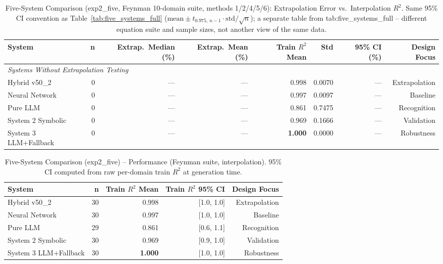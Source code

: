 \documentclass[twoside,11pt]{article}
\begin{document}
\begin{table}[t]
\centering
\caption{Five-System Comparison (exp2\_five, Feynman 10-domain suite,
  methods 1/2/4/5/6): Extrapolation Error vs.\ Interpolation $R^2$.
  Same 95\% CI convention as Table~\ref{tab:five_systems_full}
  ($\mathrm{mean} \pm t_{0.975,\,n-1} \cdot \mathrm{std}/\sqrt{n}$); a
  separate table from tab:five\_systems\_full -- different equation suite
  and sample sizes, not another view of the same data.}
\label{tab:five_systems_full_exp2five}
\begin{tabular}{lrrrrrrr}
\toprule
\textbf{System} & \textbf{n}
  & \textbf{Extrap.\ Median (\%)} & \textbf{Extrap.\ Mean (\%)}
  & \textbf{Train $R^2$ Mean} & \textbf{Std} & \textbf{95\% CI (\%)}
  & \textbf{Design Focus} \\
\midrule
\midrule
\multicolumn{8}{l}{\textit{Systems Without Extrapolation Testing}} \\
Hybrid v50\_2 & 0 & --- & --- & 0.998 & 0.0070 & --- & Extrapolation \\
Neural Network & 0 & --- & --- & 0.997 & 0.0097 & --- & Baseline \\
Pure LLM & 0 & --- & --- & 0.861 & 0.7475 & --- & Recognition \\
System 2 Symbolic & 0 & --- & --- & 0.969 & 0.1666 & --- & Validation \\
System 3 LLM+Fallback & 0 & --- & --- & \textbf{1.000} & 0.0000 & --- & Robustness \\
\bottomrule
\end{tabular}
\end{table}

\begin{table}[t]
\centering
\caption{Five-System Comparison (exp2\_five) -- Performance (Feynman suite,
  interpolation). 95\% CI computed from raw per-domain train $R^2$ at
  generation time.}
\label{tab:five_systems_performance_exp2five}
\begin{tabular}{lrrrr}
\toprule
\textbf{System} & \textbf{n} & \textbf{Train $R^2$ Mean}
  & \textbf{Train $R^2$ 95\% CI} & \textbf{Design Focus} \\
\midrule
Hybrid v50\_2 & 30 & 0.998 & [1.0, 1.0] & Extrapolation \\
Neural Network & 30 & 0.997 & [1.0, 1.0] & Baseline \\
Pure LLM & 29 & 0.861 & [0.6, 1.1] & Recognition \\
System 2 Symbolic & 30 & 0.969 & [0.9, 1.0] & Validation \\
System 3 LLM+Fallback & 30 & \textbf{1.000} & [1.0, 1.0] & Robustness \\
\bottomrule
\end{tabular}
\end{table}
\end{document}
